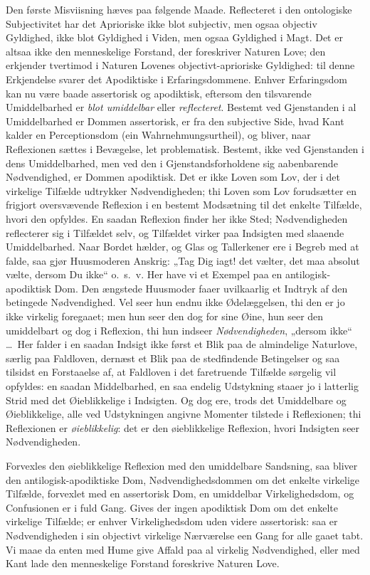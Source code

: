 \documentclass[12pt]{book}
\newcommand{\opage}[1]{\marginnote{\footnotesize\textit{[#1]}}}
\begin{document}
Den første Misviisning hæves paa følgende Maade. Reflecteret i den ontologiske Subjectivitet har det Aprioriske ikke blot subjectiv, men ogsaa objectiv Gyldighed, ikke blot Gyldighed i Viden, men ogsaa Gyldighed i Magt. Det er altsaa ikke den menneskelige Forstand, der foreskriver Naturen Love; den erkjender tvertimod i Naturen Lovenes objectivt-aprioriske Gyldighed: til denne Erkjendelse svarer det Apodiktiske i Erfaringsdommene. Enhver Erfaringsdom kan nu være baade assertorisk og apodiktisk, eftersom den tilsvarende Umiddelbarhed er \emph{blot umiddelbar} eller \emph{reflecteret}. Bestemt ved Gjenstanden i al Umiddelbarhed er Dommen assertorisk, er fra den subjective Side, hvad Kant kalder en Perceptionsdom (ein Wahrnehmungsurtheil), og bliver, naar Reflexionen sættes i Bevægelse, let problematisk. Bestemt, ikke ved Gjenstanden i dens Umiddelbarhed, men ved den i Gjenstandsforholdene sig aabenbarende Nødvendighed, er Dommen
\opage{271}apodiktisk. Det er ikke Loven som Lov, der i det virkelige
Tilfælde udtrykker Nødvendigheden; thi Loven som Lov forudsætter
en frigjort oversvævende Reflexion i en bestemt Modsætning
til det enkelte Tilfælde, hvori den opfyldes. En saadan
Reflexion finder her ikke Sted; Nødvendigheden reflecterer
sig i Tilfældet selv, og Tilfældet virker paa Indsigten
med slaaende Umiddelbarhed. Naar Bordet hælder, og Glas
og Tallerkener ere i Begreb med at falde, saa gjør Huusmoderen
Anskrig: „Tag Dig iagt! det vælter, det maa absolut
vælte, dersom Du ikke“ o.\ s.\ v. Her have vi et Exempel
paa en antilogisk-apodiktisk Dom. Den ængstede Huusmoder
faaer uvilkaarlig et Indtryk af den betingede Nødvendighed.
Vel seer hun endnu ikke Ødelæggelsen, thi den er jo ikke virkelig
foregaaet; men hun seer den dog for sine Øine, hun
seer den umiddelbart og dog i Reflexion, thi hun indseer
\emph{Nødvendigheden}, „dersom ikke“ \dots\ Her falder i en saadan
Indsigt ikke først et Blik paa de almindelige Naturlove, særlig
paa Faldloven, dernæst et Blik paa de stedfindende Betingelser
og saa tilsidst en Forstaaelse af, at Faldloven i det faretruende
Tilfælde sørgelig vil opfyldes: en saadan Middelbarhed, en
saa endelig Udstykning staaer jo i latterlig Strid med det
Øieblikkelige i Indsigten. Og dog ere, trods det Umiddelbare
og Øieblikkelige, alle ved Udstykningen angivne Momenter
tilstede i Reflexionen; thi Reflexionen er \emph{øieblikkelig}:
det er den øieblikkelige Reflexion, hvori Indsigten seer Nødvendigheden.

Forvexles den øieblikkelige Reflexion med den umiddelbare
Sandsning, saa bliver den antilogisk-apodiktiske Dom, Nødvendighedsdommen
om det enkelte virkelige Tilfælde, forvexlet
med en assertorisk Dom, en umiddelbar Virkelighedsdom, og
Confusionen er i fuld Gang. Gives der ingen apodiktisk
Dom om det enkelte virkelige Tilfælde; er enhver Virkelighedsdom
uden videre assertorisk: saa er Nødvendigheden i sin objectivt
virkelige Nærværelse een Gang for alle gaaet tabt. Vi
\opage{272}maae da enten med Hume give Affald paa al virkelig Nødvendighed,
eller med Kant lade den menneskelige Forstand
foreskrive Naturen Love.
\end{document}
